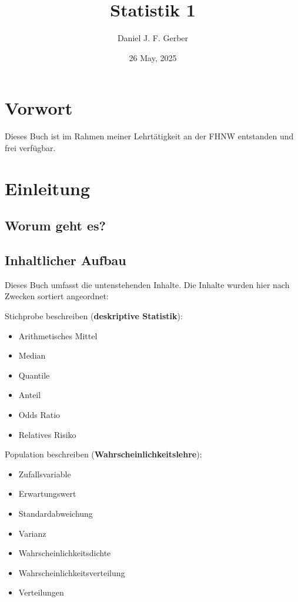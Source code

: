 \documentclass[
]{book}
\title{Statistik 1}
\author{Daniel J. F. Gerber}
\date{26 May, 2025}
\providecommand{\tightlist}{%
  \setlength{\itemsep}{0pt}\setlength{\parskip}{0pt}}
\theoremstyle{definition}
\theoremstyle{definition}
\theoremstyle{definition}
\theoremstyle{definition}
\theoremstyle{remark}
\begin{document}
\maketitle

{
\setcounter{tocdepth}{1}
\tableofcontents
}
\chapter*{Vorwort}\label{vorwort}

Dieses Buch ist im Rahmen meiner Lehrtätigkeit an der FHNW entstanden und frei verfügbar.

\chapter{Einleitung}\label{einleitung}

\section{Worum geht es?}\label{worum-geht-es}

\section{Inhaltlicher Aufbau}\label{inhaltlicher-aufbau}

Dieses Buch umfasst die untenstehenden Inhalte. Die Inhalte wurden hier nach Zwecken sortiert angeordnet:

Stichprobe beschreiben (\textbf{deskriptive Statistik}):

\begin{itemize}
\tightlist
\item
  Arithmetisches Mittel
\item
  Median
\item
  Quantile
\item
  Anteil
\item
  Odds Ratio
\item
  Relatives Risiko
\end{itemize}

Population beschreiben (\textbf{Wahrscheinlichkeitslehre}):

\begin{itemize}
\tightlist
\item
  Zufallsvariable
\item
  Erwartungswert
\item
  Standardabweichung
\item
  Varianz
\item
  Wahrscheinlichkeitsdichte
\item
  Wahrscheinlichkeitsverteilung
\item
  Verteilungen
\end{itemize}
\end{document}
